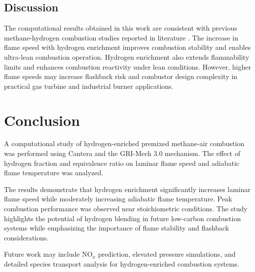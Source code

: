 \documentclass[conference]{IEEEtran}
\begin{document}
\subsection{Discussion}

The computational results obtained in this work are consistent with previous methane-hydrogen combustion studies reported in literature \cite{hesse2026physicsguidedlaminarflamespeed,Garcia_2023}. The increase in flame speed with hydrogen enrichment improves combustion stability and enables ultra-lean combustion operation. Hydrogen enrichment also extends flammability limits and enhances combustion reactivity under lean conditions. However, higher flame speeds may increase flashback risk and combustor design complexity in practical gas turbine and industrial burner applications.


\section{Conclusion}

A computational study of hydrogen-enriched premixed methane-air combustion was performed using Cantera and the GRI-Mech 3.0 mechanism. The effect of hydrogen fraction and equivalence ratio on laminar flame speed and adiabatic flame temperature was analyzed.

The results demonstrate that hydrogen enrichment significantly increases laminar flame speed while moderately increasing adiabatic flame temperature. Peak combustion performance was observed near stoichiometric conditions. The study highlights the potential of hydrogen blending in future low-carbon combustion systems while emphasizing the importance of flame stability and flashback considerations.

Future work may include NO$_x$ prediction, elevated pressure simulations, and detailed species transport analysis for hydrogen-enriched combustion systems.


\nocite{*}


\end{document}
